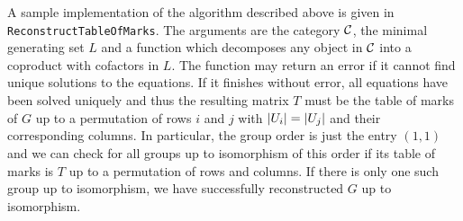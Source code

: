 \begin{rem}[Implementation]\label{rem:ReconstructTableOfMarks}
A sample implementation of the algorithm described above is given in \texttt{ReconstructTableOfMarks}. The arguments are the category $\mathcal{C}$, the minimal generating set $L$ and a function which decomposes any object in $\mathcal{C}$ into a coproduct with cofactors in $L$. The function may return an error if it cannot find unique solutions to the equations. If it finishes without error, all equations have been solved uniquely and thus the resulting matrix $T$ must be the table of marks of $G$ up to a permutation of rows $i$ and $j$ with ${\lvert U_i\rvert} = {\lvert U_j\rvert}$ and their corresponding columns. In particular, the group order is just the entry $(1,1)$ and we can check for all groups up to isomorphism of this order if its table of marks is $T$ up to a permutation of rows and columns. If there is only one such group up to isomorphism, we have successfully reconstructed $G$ up to isomorphism.
\end{rem}

